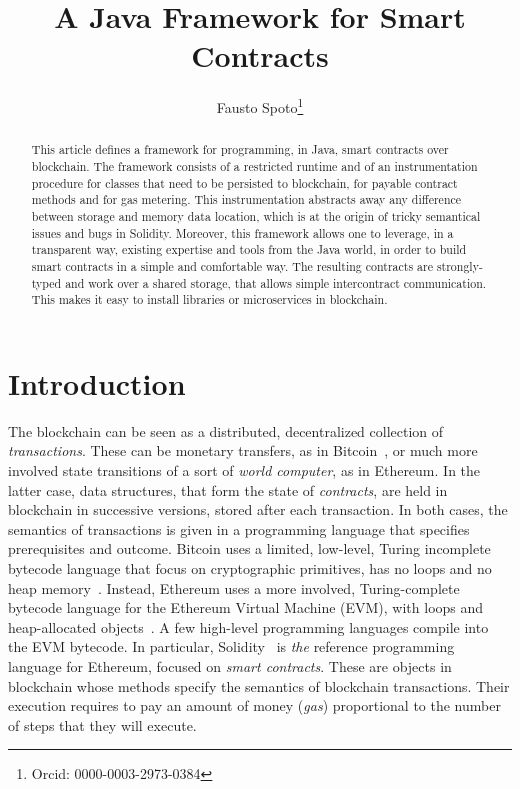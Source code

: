 \documentclass[10pt]{llncs}
\begin{document}
\title{
  A Java Framework for Smart Contracts}

\author{Fausto Spoto\thanks{Orcid: 0000-0003-2973-0384}}

\maketitle

\begin{abstract}
  This article defines a framework for programming, in Java, smart contracts
  over blockchain.
  The framework consists of a restricted runtime and of an instrumentation
  procedure for classes that need to be persisted to blockchain,
  for payable contract methods and for gas metering.
  This instrumentation
  abstracts away any difference between storage and memory data location,
  which is at the origin of tricky semantical issues and bugs in Solidity.
  Moreover, this framework allows one to leverage, in a transparent way,
  existing expertise and tools from the Java world, in order to build
  smart contracts in a simple and comfortable way. The resulting contracts
  are strongly-typed and work over a shared storage, that allows simple
  intercontract communication.
  This makes it easy to install libraries
  or microservices in blockchain.
\end{abstract}

\section{Introduction}\label{sec:introduction}

The blockchain can be seen as a distributed, decentralized
collection of \emph{transactions}. These can be
monetary transfers, as in Bitcoin~\cite{Nakamoto08}, or much more
involved state transitions
of a sort of \emph{world computer}, as in Ethereum.
In the latter case, data structures, that form the state of \emph{contracts},
are held in blockchain in successive versions,
stored after each transaction. In both cases, the semantics of transactions is
given in a programming language that specifies prerequisites
and outcome. Bitcoin uses a limited, low-level,
Turing incomplete bytecode language that focus
on cryptographic primitives, has no loops and
no heap memory~\cite{Antonopoulos17}.
Instead, Ethereum uses a more involved,
Turing-complete bytecode language for the Ethereum Virtual Machine (EVM),
with loops and heap-allocated objects~\cite{AntonopoulosW18}. A few high-level
programming languages compile into the EVM bytecode. In particular,
Solidity~\cite{solidity}
is \emph{the} reference programming language for Ethereum,
focused on \emph{smart contracts}. These are objects
in blockchain whose methods specify the semantics of blockchain transactions.
Their execution requires to pay an amount of money (\emph{gas})
proportional to the number of steps that they will execute.
\end{document}
